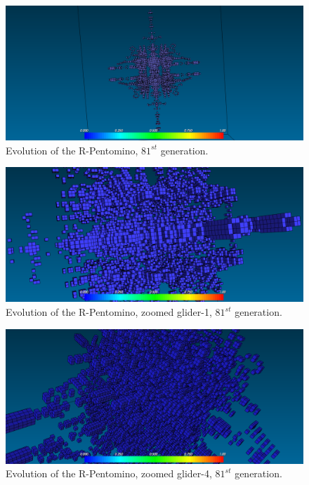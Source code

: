 \begin{figure}
	\centering
	\includegraphics[scale=0.3]{pentominoes_ss/r_81.png}
	\caption{Evolution of the R-Pentomino, $81^{st}$ generation.}
  \label{fig:ss-pent:r-81}
\end{figure}

\begin{figure}
	\centering
	\includegraphics[scale=0.3]{pentominoes_ss/r_81_glider1.png}
	\caption{Evolution of the R-Pentomino, zoomed glider-1, $81^{st}$ generation.}
  \label{fig:ss-pent:r-81-glider1}
\end{figure}

\begin{figure}
	\centering
	\includegraphics[scale=0.3]{pentominoes_ss/r_81_glider4.png}
	\caption{Evolution of the R-Pentomino, zoomed glider-4, $81^{st}$ generation.}
  \label{fig:ss-pent:r-81-glider4}
\end{figure}

